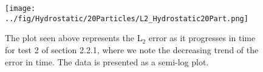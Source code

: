 \documentclass{../GPUSPHtemplate}
\begin{document}
\begin{figure}[H]
  \centering
  \texttt{[image: ../fig/Hydrostatic/20Particles/L2\_Hydrostatic20Part.png]}
  \caption{The plot seen above represents the L$_2$ error as it progresses in time for test 2 of section 2.2.1, where we note the decreasing trend of the error in time. The data is presented as a semi-log plot. }
  \label{fig:HydroExp2L2}
\end{figure}


\end{document}
